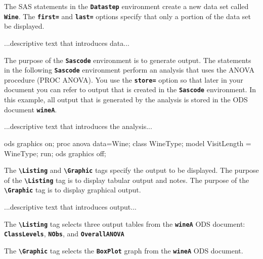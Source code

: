 \documentclass{article}
\newcommand*{\Code}[1]{\texttt{\textbf{#1}}}
\newcommand*{\cs}[1]{\texttt{\textbf{\textbackslash#1}}}
\begin{document}
The SAS statements in the \Code{Datastep} environment create a new data set 
called \Code{Wine}. The \Code{first=} and \Code{last=} options specify that 
only a portion of the data set be displayed.

...descriptive text that introduces data...


The purpose of the \Code{Sascode} environment is to generate output.
The statements in the following \Code{Sascode} environment perform an 
analysis that uses the ANOVA procedure (PROC ANOVA). 
You use the \Code{store=} option so that 
later in your document
you can refer to output that is created in the \Code{Sascode}
environment.
In this example, all output that is generated by the analysis is stored in the ODS document 
\Code{wineA}.

...descriptive text that introduces the analysis...

\begin{Sascode}[store=wineA]
ods graphics on;
proc anova data=Wine;
   class WineType;
   model VisitLength = WineType;
run;
ods graphics off;
\end{Sascode}
The \cs{Listing} and \cs{Graphic} tags specify the output to be displayed.
The purpose of the \cs{Listing} tag is to display tabular output and notes.
The purpose of the \cs{Graphic} tag is to display graphical output.

...descriptive text that introduces output...

The \cs{Listing} tag selects three output tables from the \Code{wineA} ODS document:
\Code{ClassLevels}, \Code{NObs}, and \Code{OverallANOVA}



The \cs{Graphic} tag selects the \Code{BoxPlot}
graph from the \Code{wineA} ODS document.
\end{document}
